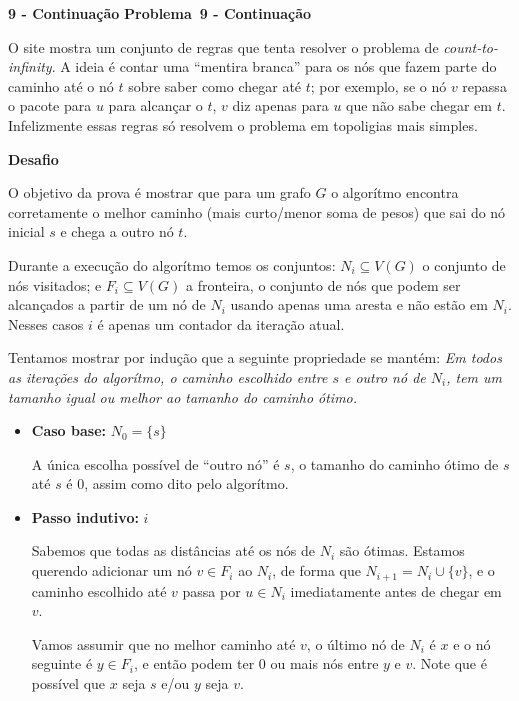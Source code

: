 \documentclass{article}
\newcounter{exe-list}
\newenvironment{exe}[2][Problema]
    {\newcommand{\opt}{(Opcional)}%
    \newcommand{\sketch}[1]{{\bfseries Rascunho:} ##1}%
    \medskip\par\noindent\ifthenelse{\equal{#1}{}}
        {\textbf{\large #2}}
        {\textbf{\large #1~#2}}%
    \medskip\par\noindent}
    {\medskip}
\begin{document}
\begin{exe}{9 - Continuação}
    O site mostra um conjunto de regras que tenta resolver
    o problema de \emph{count-to-infinity}.
    A ideia é contar uma ``mentira branca'' para os nós
    que fazem parte do caminho até o nó \(t\) sobre
    saber como chegar até \(t\);
    por exemplo, se o nó \(v\) repassa o pacote para \(u\)
    para alcançar o \(t\), \(v\) diz apenas para \(u\)
    que não sabe chegar em \(t\).
    Infelizmente essas regras só resolvem o problema
    em topoligias mais simples.
\end{exe}

\begin{exe}[Desafio]{}
    O objetivo da prova é mostrar que para um grafo \(G\)
    o algorítmo encontra corretamente
    o melhor caminho (mais curto/menor soma de pesos)
    que sai do nó inicial \(s\) e chega a outro nó \(t\).

    Durante a execução do algorítmo temos os conjuntos:
    \(N_i \subseteq V(G)\) o conjunto de nós visitados; e
    \(F_i \subseteq V(G)\) a fronteira,
    o conjunto de nós que podem ser
    alcançados a partir de um nó de \(N_i\) usando apenas uma aresta
    e não estão em \(N_i\).
    Nesses casos \(i\) é apenas um contador da iteração atual.

    Tentamos mostrar por indução que a seguinte propriedade se mantém:
    \emph{Em todos as iterações do algorítmo,
    o caminho escolhido entre \(s\) e outro nó de \(N_i\),
    tem um tamanho igual ou melhor ao tamanho do caminho ótimo.}
    \begin{itemize}
        \item \textbf{Caso base:} \(N_0 = \{ s \}\) \par
            A única escolha possível de ``outro nó'' é \(s\),
            o tamanho do caminho ótimo de \(s\) até \(s\) é \(0\),
            assim como dito pelo algorítmo.
        \item \textbf{Passo indutivo:} \(i\) \par
            Sabemos que todas as distâncias até os nós de \(N_i\)
            são ótimas.
            Estamos querendo adicionar um nó \(v \in F_i\) ao \(N_i\),
            de forma que \(N_{i+1} = N_i \cup \{v\}\),
            e o caminho escolhido até \(v\) passa por \(u \in N_i\)
            imediatamente antes de chegar em \(v\).

            Vamos assumir que no melhor caminho até \(v\),
            o último nó de \(N_i\) é \(x\) e
            o nó seguinte é \(y \in F_i\),
            e então podem ter \(0\) ou mais nós entre \(y\) e \(v\).
            Note que é possível que
            \(x\) seja \(s\) e/ou \(y\) seja \(v\).


\end{itemize}
\end{exe}
\end{document}

